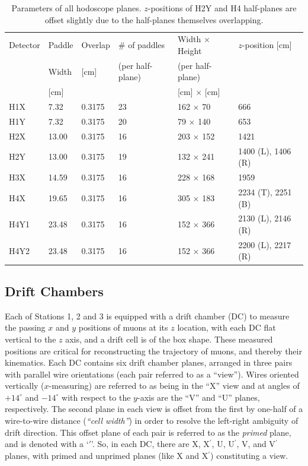 \begin{table}[bthp]\centering
	\begin{tabular}{llllll}
		\hline
		\hline
		Detector & Paddle & Overlap & \# of paddles & Width $\times$ Height & $z$-position [cm] \\
		& Width & [cm] & (per half-plane) & (per half-plane) &  \\
		& [cm] & & & [cm] $\times$ [cm] & \\
		\hline
		H1X & 7.32 & 0.3175 & 23 & 162 $\times$ 70 & 666 \\
		H1Y & 7.32 & 0.3175 & 20 & 79 $\times$ 140 & 653 \\
		H2X & 13.00 & 0.3175 & 16 & 203 $\times$ 152 & 1421 \\
		H2Y & 13.00 & 0.3175 & 19  & 132 $\times$ 241 & 1400 (L), 1406 (R) \\
		H3X & 14.59 & 0.3175 & 16  & 228 $\times$ 168 & 1959 \\
		H4X & 19.65 & 0.3175 & 16  &  305 $\times$ 183 & 2234 (T), 2251 (B) \\
		H4Y1 & 23.48 & 0.3175 & 16  & 152 $\times$ 366 & 2130 (L), 2146 (R) \\
		H4Y2 & 23.48 & 0.3175 & 16  & 152 $\times$ 366 & 2200 (L), 2217 (R)\\
		\hline
		\hline
	\end{tabular}
	\caption{Parameters of all hodoscope planes. $z$-positions of H2Y and H4 half-planes are offset slightly due to the half-planes themselves overlapping.}
	\label{tab:hodoscopes}
\end{table}

\subsection{Drift Chambers}

Each of Stations 1, 2 and 3 is equipped with a drift chamber (DC) to measure the passing $x$ and $y$ positions of muons at its $z$ location, with each DC flat vertical to the $z$ axis, and a drift cell is of the box shape. These measured positions are critical for reconstructing the trajectory of muons, and thereby their kinematics. Each DC contains six drift chamber planes, arranged in three pairs with parallel wire orientations (each pair referred to as a ``view''). Wires oriented vertically ($x$-measuring) are referred to as being in the ``X'' view and at angles of $+14^\circ$ and $-14^\circ$ with respect to the $y$-axis are the ``V'' and ``U'' planes, respectively. The second plane in each view is offset from the first by one-half of a wire-to-wire distance (\emph{``cell width''}) in order to resolve the left-right ambiguity of drift direction. This offset plane of each pair is referred to as the \emph{primed} plane, and is denoted with a `$\prime$'. So, in each DC, there are X, X$^\prime$, U, U$^\prime$, V, and V$^\prime$ planes, with primed and unprimed planes (like X and X$^\prime$) constituting a view.

